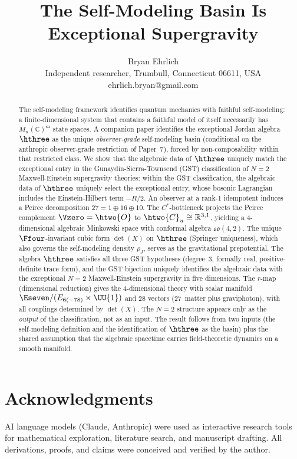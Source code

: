\documentclass[11pt]{article}
\title{The Self-Modeling Basin Is Exceptional Supergravity}
\author{Bryan Ehrlich\\[4pt]
  \normalsize Independent researcher, Trumbull, Connecticut 06611, USA\\
  \normalsize ehrlich.bryan@gmail.com}
\date{}
\begin{document}
\maketitle

\begin{abstract}
The self-modeling framework identifies quantum mechanics with
faithful self-modeling: a finite-dimensional system that contains a
faithful model of itself necessarily has
$M_n(\mathbb{C})^{\mathrm{sa}}$ state spaces. A companion paper
identifies the exceptional Jordan algebra $\hthree$ as the unique
\emph{observer-grade} self-modeling basin (conditional on the anthropic observer-grade restriction of Paper~7), forced by non-composability within that restricted class. We show that the
algebraic data of $\hthree$ uniquely match the exceptional entry in
the Gunaydin-Sierra-Townsend (GST) classification of $N{=}2$
Maxwell-Einstein supergravity theories: within the GST
classification, the algebraic data of $\hthree$ uniquely select the
exceptional entry, whose bosonic Lagrangian includes the
Einstein-Hilbert term $-R/2$. An
observer at a rank-1 idempotent induces a Peirce decomposition
$27 = 1 \oplus 16 \oplus 10$. The $C^*$-bottleneck projects the
Peirce complement $\Vzero = \htwo{O}$ to
$\htwo{C}_u \cong \mathbb{R}^{3,1}$, yielding a 4-dimensional
algebraic Minkowski space with conformal algebra
$\mathfrak{so}(4,2)$. The unique $\Ffour$-invariant cubic form
$\det(X)$ on $\hthree$ (Springer uniqueness), which also governs
the self-modeling density $\rho_J$, serves as the gravitational
prepotential. The algebra $\hthree$ satisfies all three GST
hypotheses (degree~3, formally real, positive-definite trace form),
and the GST bijection uniquely identifies the algebraic data with
the exceptional $N{=}2$ Maxwell-Einstein supergravity in five
dimensions. The $r$-map (dimensional reduction) gives the
4-dimensional theory with scalar manifold
$\Eseven / (E_{6(-78)} \times \UU{1})$ and 28 vectors (27~matter
plus graviphoton), with all couplings determined by $\det(X)$.
The $N{=}2$ structure appears only as the \emph{output} of the
classification, not as an input. The result follows from two
inputs (the self-modeling definition and the identification of
$\hthree$ as the basin) plus the shared assumption that the
algebraic spacetime carries field-theoretic dynamics on a smooth
manifold.
\end{abstract}








\section*{Acknowledgments}

AI language models (Claude, Anthropic) were used as interactive research
tools for mathematical exploration, literature search, and manuscript
drafting.  All derivations, proofs, and claims were conceived and verified
by the author.



\end{document}
